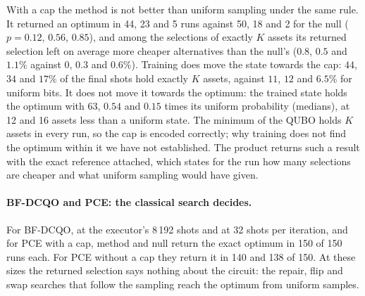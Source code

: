 \documentclass[11pt,a4paper]{article}
\begin{document}
With a cap the method is not better than uniform sampling under the same
rule. It returned an optimum in 44, 23 and 5 runs against 50, 18 and 2 for
the null ($p = 0.12$, $0.56$, $0.85$), and among the selections of exactly
$K$ assets its returned selection left on average more cheaper alternatives
than the null's ($0.8$, $0.5$ and $1.1\%$ against $0$, $0.3$ and $0.6\%$).
Training does move the state towards the cap: $44$, $34$ and $17\%$ of the
final shots hold exactly $K$ assets, against $11$, $12$ and $6.5\%$ for
uniform bits. It does not move it towards the optimum: the trained state
holds the optimum with 63, $0.54$ and $0.15$ times its uniform probability
(medians), at 12 and 16 assets less than a uniform state. The minimum of the
QUBO holds $K$ assets in every run, so the cap is encoded correctly; why
training does not find the optimum within it we have not established. The
product returns such a result with the exact reference attached, which
states for the run how many selections are cheaper and what uniform sampling
would have given.

\paragraph{BF-DCQO and PCE: the classical search decides.} For BF-DCQO, at
the executor's 8\,192 shots and at 32 shots per iteration, and for PCE with
a cap, method and null return the exact optimum in 150 of 150 runs each. For
PCE without a cap they return it in 140 and 138 of 150. At these sizes the
returned selection says nothing about the circuit: the repair, flip and swap
searches that follow the sampling reach the optimum from uniform samples.
\end{document}
